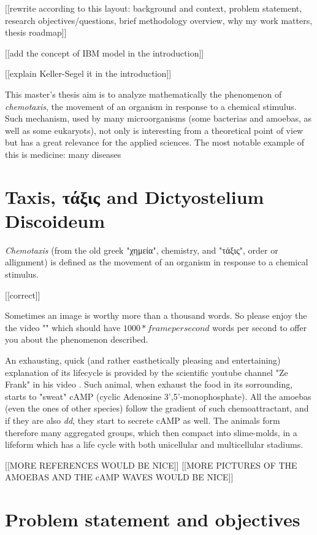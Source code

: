 [[rewrite according to this layout: background and context, problem statement, research objectives/questions, brief methodology overview, why my work matters, thesis roadmap]]

[[add the concept of IBM model in the introduction]]

[[explain Keller-Segel it in the introduction]]


This master's thesis aim is to analyze mathematically the phenomenon of \emph{chemotaxis}, \ie the movement of an organism in response to a chemical stimulus.
Such mechanism, used by many microorganisms (some bacterias and amoebas, as well as some eukaryots), not only is interesting from a theoretical point of view but has a great relevance for the applied sciences.
The most notable example of this is medicine: many diseases 



\section{Taxis, τάξις and Dictyostelium Discoideum}

\emph{Chemotaxis} (from the old greek "χημεία", chemistry, and "τάξις", order or allignment) is defined as the movement of an organism in response to a chemical stimulus.



[[correct]]

Sometimes an image is worthy more than a thousand words. So please enjoy the the video "" which should have $1000* frame per second$ words per second to offer you about the phenomenon described.




An exhausting, quick (and rather easthetically pleasing and entertaining) explanation of its lifecycle is provided by the scientific youtube channel "Ze Frank" in his video \citep{ze-frank}.
Such animal, when exhaust the food in its sorrounding, starts to "sweat" cAMP (cyclic Adenosine 3',5'-monophosphate).
All the amoebas (even the ones of other species) follow the gradient of such chemoattractant, and if they are also \emph{dd}, they start to secrete cAMP as well.
The animals form therefore many aggregated groups, which then compact into slime-molds, in a lifeform which has a life cycle with both unicellular and multicellular stadiums.

[[MORE REFERENCES WOULD BE NICE]]
[[MORE PICTURES OF THE AMOEBAS AND THE cAMP WAVES WOULD BE NICE]]

\section{Problem statement and objectives}

